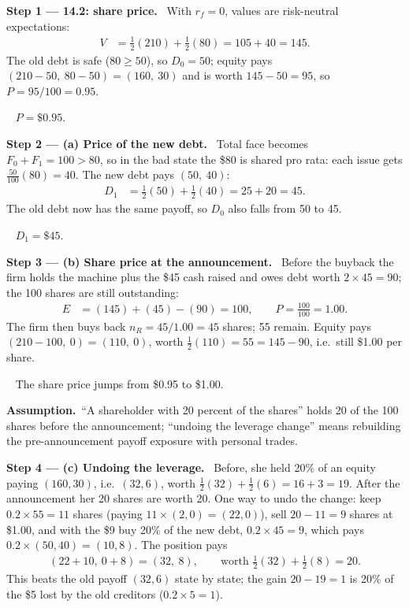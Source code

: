\documentclass[11pt,a4paper]{article}
\numberwithin{equation}{section}
\newcommand{\step}[2]{\par\smallskip\noindent\textbf{Step #1 --- #2.}~}
\newcommand{\assumption}{\par\smallskip\noindent\textbf{Assumption.}~}
\newcommand{\answer}[1]{\par\smallskip\noindent\fbox{\textbf{Answer #1.}}~}
\begin{document}
\step{1}{14.2: share price} With $r_f=0$, values are risk-neutral expectations:
\begin{align}
  V &= \tfrac12(210)+\tfrac12(80) = 105+40 = 145. \label{eq:11V}
\end{align}
The old debt is safe ($80\ge50$), so $D_0=50$; equity pays $(210-50,\ 80-50)=(160,\ 30)$ and is
worth $145-50=95$, so $P=95/100=0.95$.
\answer{(14.2)} $P=\$0.95$.

\step{2}{(a) Price of the new debt} Total face becomes $F_0+F_1=100>80$, so in the bad state the
\$80 is shared pro rata: each issue gets $\tfrac{50}{100}(80)=40$. The new debt pays $(50,\ 40)$:
\begin{align}
  D_1 &= \tfrac12(50)+\tfrac12(40) = 25+20 = 45. \label{eq:11D1}
\end{align}
The old debt now has the same payoff, so $D_0$ also falls from 50 to 45.
\answer{(a)} $D_1=\$45$.

\step{3}{(b) Share price at the announcement} Before the buyback the firm holds the machine plus
the \$45 cash raised and owes debt worth $2\times45=90$; the 100 shares are still outstanding:
\begin{align}
  E &= (145)+(45)-(90) = 100, \qquad P = \frac{100}{100} = 1.00. \label{eq:11P}
\end{align}
The firm then buys back $n_R=45/1.00=45$ shares; 55 remain. Equity pays
$(210-100,\ 0)=(110,\ 0)$, worth $\tfrac12(110)=55=145-90$, i.e.\ still \$1.00 per share.
\answer{(b)} The share price jumps from \$0.95 to \$1.00.

\assumption ``A shareholder with 20 percent of the shares'' holds 20 of the 100 shares before
the announcement; ``undoing the leverage change'' means rebuilding the pre-announcement payoff
exposure with personal trades.

\step{4}{(c) Undoing the leverage} Before, she held 20\% of an equity paying $(160,30)$, i.e.\
$(32,6)$, worth $\tfrac12(32)+\tfrac12(6)=16+3=19$. After the announcement her 20 shares are
worth 20. One way to undo the change: keep $0.2\times55=11$ shares (paying $11\times(2,0)=(22,0)$),
sell $20-11=9$ shares at \$1.00, and with the \$9 buy 20\% of the new debt, $0.2\times45=9$,
which pays $0.2\times(50,40)=(10,8)$. The position pays
\begin{align}
  (22+10,\ 0+8) = (32,\ 8), \qquad \text{worth } \tfrac12(32)+\tfrac12(8) = 20. \label{eq:11c}
\end{align}
This beats the old payoff $(32,6)$ state by state; the gain $20-19=1$ is 20\% of the \$5 lost by
the old creditors ($0.2\times5=1$).
\end{document}
